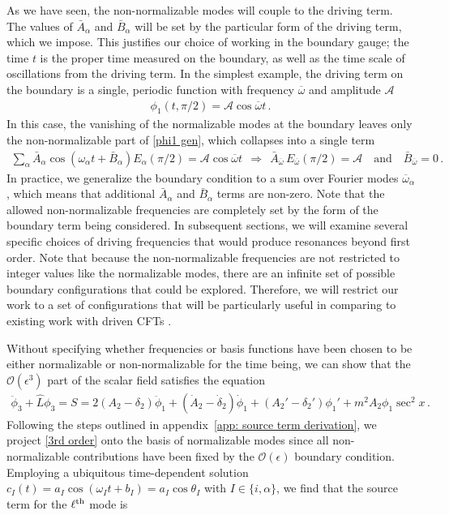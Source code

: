 \documentclass[letterpaper,11pt]{article}
\newcommand{\mc}{\mathcal}
\newcommand{\ob}{\overline{\omega}}
\begin{document}
As we have seen, the non-normalizable modes will couple to the driving term. The values of $\bar A_\alpha$ and 
$\bar{B}_\alpha$ will be set by the particular form of the driving term, which we impose. This justifies 
our choice of working in the boundary gauge; the time $t$ is the proper time measured on the boundary, 
as well as the time scale of oscillations from the driving term. In the simplest example, the driving term 
on the boundary is a single, periodic function with frequency $\ob$ and amplitude $\mc A$
\begin{align}
\label{BC}
\phi_1(t,\pi/2) = \mc A \cos \ob t \, .
\end{align}
In this case, the vanishing of the normalizable modes at the boundary leaves only the
non-normalizable part of \eqref{phi1 gen}, which collapses into a single term
\begin{align}
\sum_\alpha \bar A_\alpha \cos (\omega_\alpha t + \bar B_\alpha )  E_{\alpha} (\pi / 2) = \mc A \cos \ob t \:\: \Rightarrow \:\: \bar A_{\ob} \, E_{\ob} (\pi / 2) = \mc A \quad \text{and} \quad \bar B_{\ob} = 0 \, .
\end{align}
In practice, we generalize the boundary condition to a sum over Fourier modes $\ob_\alpha$, which means 
that additional $\bar A_\alpha$ and $\bar B_\alpha$ terms are non-zero. Note that the allowed non-normalizable frequencies
are completely set by the form of the boundary term being considered. In subsequent sections, we will
examine several specific choices of driving frequencies that would produce resonances beyond first order.
Note that because the non-normalizable frequencies are not restricted to integer values like the normalizable
modes, there are an infinite set of possible boundary configurations that could be explored. Therefore, we
will restrict our work to a set of configurations that will be particularly useful in comparing to 
existing work with driven CFTs \cite{1502.05726, 1612.07701, 1805.00031}.

Without specifying whether frequencies or basis functions have been chosen to be either normalizable or non-normalizable for the time being, we can show that the $\mc O(\epsilon^3)$ part of the scalar field satisfies the equation
\begin{align}
\label{3rd order}
\ddot \phi_3 + \hat L \phi_3 = S = 2 (A_2 - \delta_2) \ddot \phi_1 + (\dot A_2 - \dot \delta_2) \dot\phi_1 + (A_2' -\delta_2' )\phi_1' + m^2 A_2 \phi_1 \sec^2 x \, .
\end{align}
Following the steps outlined in appendix~\ref{app: source term derivation}, we project \eqref{3rd order} onto the basis of normalizable modes since all non-normalizable contributions have been fixed by the $\mc O(\epsilon)$ boundary condition. Employing a ubiquitous time-dependent solution ${c_I(t) = a_I \cos (\omega_I t + b_I) = a_I \cos\theta_I}$ with $I \in \{i, \alpha \}$, we find that the source term for the $\ell^{\rm th}$ mode is
\end{document}
